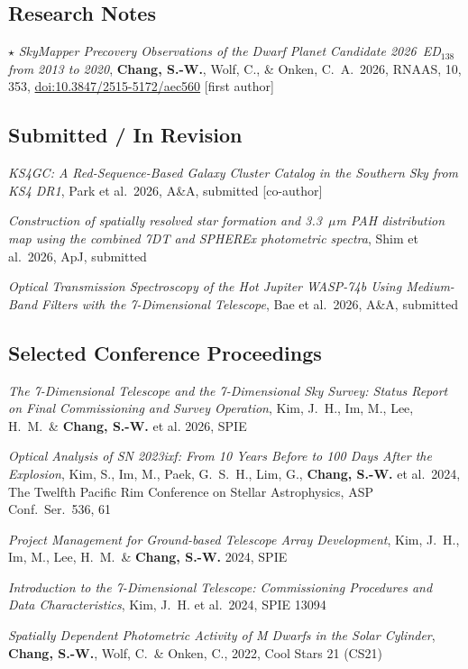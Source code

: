 \documentclass[letterpaper,11pt]{article}
\begin{document}
\subsection*{Research Notes}
\begin{etaremune}
\item $\star$ \emph{SkyMapper Precovery Observations of the Dwarf Planet Candidate 2026~ED$_{138}$ from 2013 to 2020},
\textbf{Chang, S.-W.}, Wolf, C., \& Onken, C.~A.\ 2026, RNAAS, 10, 353,
\href{https://doi.org/10.3847/2515-5172/aec560}{doi:10.3847/2515-5172/aec560} [first author]
\end{etaremune}

\subsection*{Submitted / In Revision}
\begin{etaremune}
\item \emph{KS4GC: A Red-Sequence-Based Galaxy Cluster Catalog in the Southern Sky from
KS4 DR1}, Park et al.\ 2026, A\&A, submitted [co-author]
\item \emph{Construction of spatially resolved star formation and 3.3~$\mu$m PAH distribution map using the combined 7DT and SPHEREx photometric spectra}, Shim et al.\ 2026, ApJ, submitted
\item \emph{Optical Transmission Spectroscopy of the Hot Jupiter WASP-74b Using Medium-Band Filters with the 7-Dimensional Telescope}, Bae et al.\ 2026, A\&A, submitted

\end{etaremune}

\subsection*{Selected Conference Proceedings}
\begin{etaremune}
\item \emph{The 7-Dimensional Telescope and the 7-Dimensional Sky Survey: Status Report on Final Commissioning and Survey Operation}, Kim, J.~H., Im, M., Lee, H.~M.\ \& \textbf{Chang, S.-W.} et al. 2026, SPIE
\item \emph{Optical Analysis of SN 2023ixf: From 10 Years Before to 100 Days After the
Explosion}, Kim, S., Im, M., Paek, G.~S.~H., Lim, G., \textbf{Chang, S.-W.} et al.\ 2024,
The Twelfth Pacific Rim Conference on Stellar Astrophysics, ASP Conf.\ Ser.\ 536, 61
\item \emph{Project Management for Ground-based Telescope Array Development},
Kim, J.~H., Im, M., Lee, H.~M.\ \& \textbf{Chang, S.-W.} 2024, SPIE
\item \emph{Introduction to the 7-Dimensional Telescope: Commissioning Procedures and Data
Characteristics}, Kim, J.~H. et al.\ 2024, SPIE 13094
\item \emph{Spatially Dependent Photometric Activity of M Dwarfs in the Solar Cylinder},
\textbf{Chang, S.-W.}, Wolf, C.\ \& Onken, C., 2022, Cool Stars 21 (CS21)
\end{etaremune}
\end{document}
